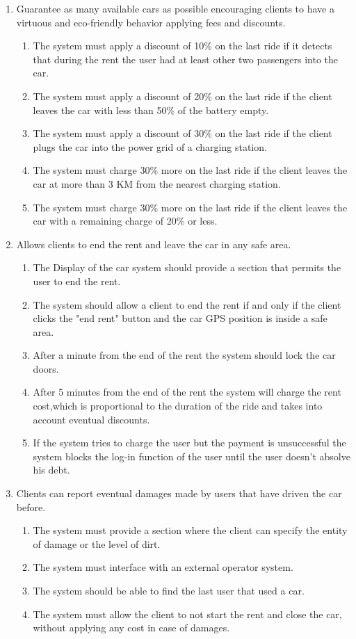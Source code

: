 \begin{enumerate}
\item Guarantee as many available cars as possible encouraging clients to have a virtuous and eco-friendly behavior applying fees and discounts.
\begin{enumerate}
\item The system must apply  a discount of 10\% on the last ride if it detects that during the rent the user had at least other two passengers into the car.
\item The system must apply a discount of 20\% on the last ride if the client leaves the car with less than 50\% of the battery empty.
\item The system must apply a discount of 30\% on the last ride if the client plugs the car into the power grid of a charging station.
\item The system must charge 30\% more on the last ride if the client leaves the car at more than 3 KM from the nearest charging station.
\item The system must charge 30\% more on the last ride if the client leaves the car with a remaining charge of 20\% or less.
\end{enumerate}
	

\item Allows clients to end the rent and leave the car in any safe area.
\begin{enumerate}
\item The Display of the car system should provide a section that permits the user to end the rent.
\item The system should allow a client to end the rent if and only if the client clicks the "end rent" button and the car GPS position is inside a safe area.
\item After a minute from the end of the rent the system should lock the car doors.
\item After 5 minutes from the end of the rent the system will charge the rent cost,which is proportional to the duration of the ride and takes into account eventual discounts.
\item If the system tries to charge the user but the payment is unsuccessful the system blocks the log-in function of the user until the user doesn't absolve his debt. 
\end{enumerate}

\item Clients can report eventual damages made by users that have driven the car before.
\begin{enumerate}
\item The system must provide a section where the client can specify the entity of damage or the level of dirt.
\item The system must interface with an external operator system.
\item The system should be able to find the last user that used a car.
\item The system must allow the client to not start the rent and close the car, without applying any cost in case of damages.
\end{enumerate}


\end{enumerate}
